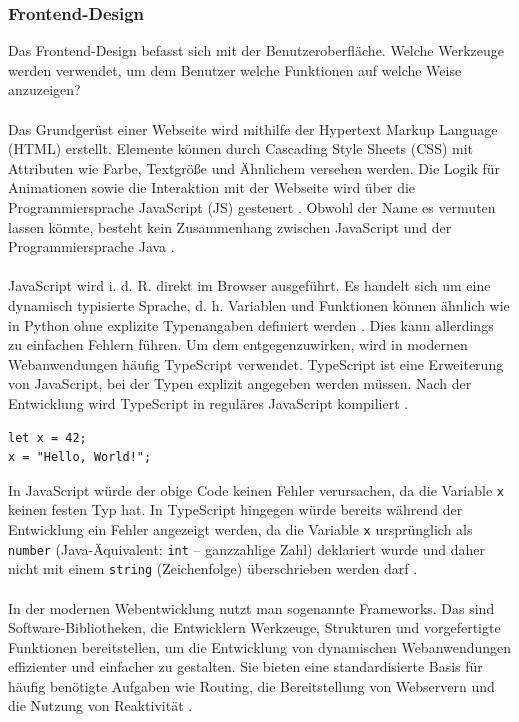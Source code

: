 \subsubsection{Frontend-Design}
Das Frontend-Design befasst sich mit der Benutzeroberfläche. Welche Werkzeuge werden verwendet, um dem Benutzer welche Funktionen auf welche Weise anzuzeigen? \parencite{mccartney-2024}\\\\
Das Grundgerüst einer Webseite wird mithilfe der Hypertext Markup Language (HTML) erstellt. Elemente können durch Cascading Style Sheets (CSS) mit Attributen wie Farbe, Textgröße und Ähnlichem versehen werden. Die Logik für Animationen sowie die Interaktion mit der Webseite wird über die Programmiersprache JavaScript (JS) gesteuert \parencite{mdn-getting-started-web}. Obwohl der Name es vermuten lassen könnte, besteht kein Zusammenhang zwischen JavaScript und der Programmiersprache Java \parencite{geeksforgeeks-2024}.\\\\
JavaScript wird \acrshort{i. d. R.} direkt im Browser ausgeführt. Es handelt sich um eine dynamisch typisierte Sprache, \acrshort{d. h.} Variablen und Funktionen können ähnlich wie in Python ohne explizite Typenangaben definiert werden \parencite{mdn-javascript}. Dies kann allerdings zu einfachen Fehlern führen. Um dem entgegenzuwirken, wird in modernen Webanwendungen häufig TypeScript verwendet. TypeScript ist eine Erweiterung von JavaScript, bei der Typen explizit angegeben werden müssen. Nach der Entwicklung wird TypeScript in reguläres JavaScript kompiliert \parencite{typescript-tutorial-2024}.
\begin{verbatim}
let x = 42;
x = "Hello, World!";
\end{verbatim}
In JavaScript würde der obige Code keinen Fehler verursachen, da die Variable \texttt{x} keinen festen Typ hat. In TypeScript hingegen würde bereits während der Entwicklung ein Fehler angezeigt werden, da die Variable \texttt{x} ursprünglich als \texttt{number} (Java-Äquivalent: \texttt{int} – ganzzahlige Zahl) deklariert wurde und daher nicht mit einem \texttt{string} (Zeichenfolge) überschrieben werden darf \parencite{typescript-tutorial-2024}.\\\\
In der modernen Webentwicklung nutzt man sogenannte Frameworks. Das sind Software-Bibliotheken, die Entwicklern Werkzeuge, Strukturen und vorgefertigte Funktionen bereitstellen, um die Entwicklung von dynamischen Webanwendungen effizienter und einfacher zu gestalten. Sie bieten eine standardisierte Basis für häufig benötigte Aufgaben wie Routing, die Bereitstellung von Webservern und die Nutzung von Reaktivität \parencite{mdn-intro-to-cs-frameworks}.\\\\
